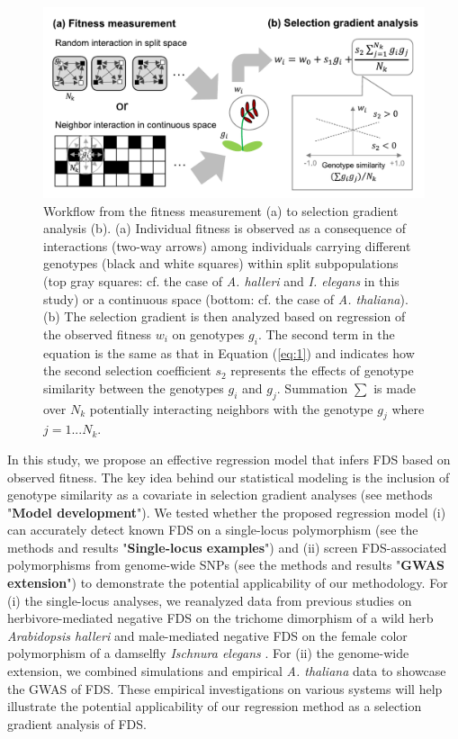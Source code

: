 \documentclass[12pt,]{article}
\begin{document}
\begin{figure}[ht]
  \includegraphics[width=\linewidth]{scheme.pdf}
  \caption{Workflow from the fitness measurement (a) to selection gradient analysis (b). (a) Individual fitness is observed as a consequence of interactions (two-way arrows) among individuals carrying different genotypes (black and white squares) within split subpopulations (top gray squares: cf. the case of \textit{A. halleri} and \textit{I. elegans} in this study) or a continuous space (bottom: cf. the case of \textit{A. thaliana}). (b) The selection gradient is then analyzed based on regression of the observed fitness $w_i$ on genotypes $g_i$. The second term in the equation is the same as that in Equation (\ref{eq:1}) and indicates how the second selection coefficient $s_2$ represents the effects of genotype similarity between the genotypes $g_i$ and $g_j$. Summation $\sum$ is made over $N_k$ potentially interacting neighbors with the genotype $g_j$ where $j = 1 ... N_k$.
}
  \label{fig1:scheme}
\end{figure}

In this study, we propose an effective regression model that infers FDS based on observed fitness. The key idea behind our statistical modeling is the inclusion of genotype similarity as a covariate in selection gradient analyses (see methods "\textbf{Model development}"). We tested whether the proposed regression model (i) can accurately detect known FDS on a single-locus polymorphism (see the methods and results "\textbf{Single-locus examples}") and (ii) screen FDS-associated polymorphisms from genome-wide SNPs (see the methods and results "\textbf{GWAS extension}") to demonstrate the potential applicability of our methodology. For (i) the single-locus analyses, we reanalyzed data from previous studies on herbivore-mediated negative FDS on the trichome dimorphism of a wild herb \textit{Arabidopsis halleri} \citep{sato2017herbivore} and male-mediated negative FDS on the female color polymorphism of a damselfly \textit{Ischnura elegans} \citep{takahashi2014evolution}. For (ii) the genome-wide extension, we combined simulations and empirical \textit{A. thaliana} data to showcase the GWAS of FDS. These empirical investigations on various systems will help illustrate the potential applicability of our regression method as a selection gradient analysis of FDS.
\end{document}

